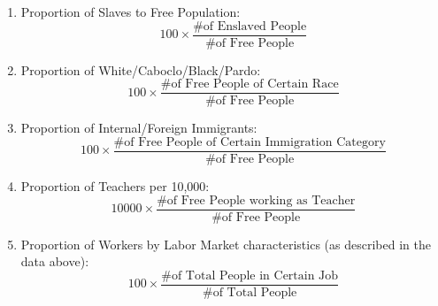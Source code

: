 \documentclass{article}
\begin{document}
\begin{enumerate}
  \item Proportion of Slaves to Free Population:
  $$ 100 \times \frac{\text{\# of Enslaved People}}{\text{\# of Free People}} $$

  \item Proportion of White/Caboclo/Black/Pardo:
  $$ 100 \times \frac{\text{\# of Free People of Certain Race}}{\text{\# of Free People}}$$

  \item Proportion of Internal/Foreign Immigrants:
  $$ 100 \times \frac{\text{\# of Free People of Certain Immigration Category}}{\text{\# of Free People}}$$
  \item Proportion of Teachers per 10,000:
  $$ 10000 \times \frac{\text{\# of Free People working as Teacher}}{\text{\# of Free People}}$$
  \item Proportion of Workers by Labor Market characteristics (as described in the data above):
  $$ 100 \times \frac{\text{\# of Total People in Certain Job}}{\text{\# of Total People}}$$
\end{enumerate}

\clearpage
\end{document}
